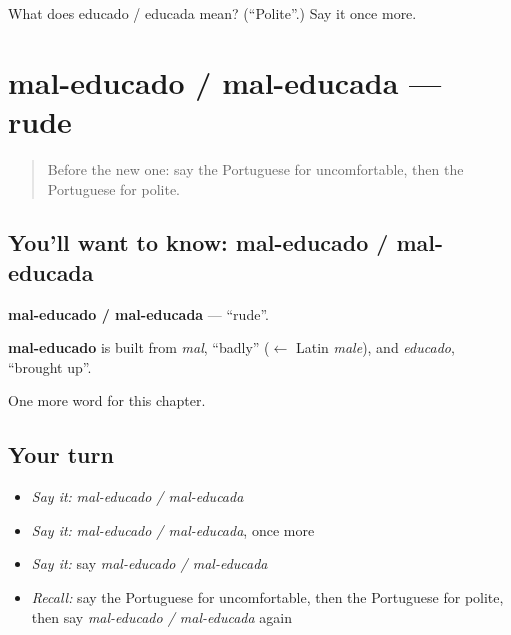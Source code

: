 \begin{tcolorbox}[breakable,colback=teal!4,colframe=teal!35!black,title={Before you move on}]
What does educado / educada mean? (\textquotedblleft{}Polite\textquotedblright{}.) Say it once more.
\end{tcolorbox}
\section[mal-educado / mal-educada]{mal-educado / mal-educada — rude}

\label{lesson:PT-C153-mal-educado-mal-educada}



\begin{quote}
Before the new one: say the Portuguese for uncomfortable, then the Portuguese for polite.
\end{quote}

\subsection*{You'll want to know: mal-educado / mal-educada}
\textbf{mal-educado / mal-educada} — \textquotedblleft{}rude\textquotedblright{}.

\begin{cousinweb}
\textbf{mal-educado} is built from \emph{mal}, \textquotedblleft{}badly\textquotedblright{} ($\leftarrow$ Latin \emph{male}), and \emph{educado}, \textquotedblleft{}brought up\textquotedblright{}.
\end{cousinweb}

\begin{grammarlens}[title={What you've built}]
One more word for this chapter.
\end{grammarlens}

\subsection*{Your turn}
\begin{itemize}
\raggedright
  \item \emph{Say it:} \emph{mal-educado / mal-educada}
  \item \emph{Say it:} \emph{mal-educado / mal-educada}, once more
  \item \emph{Say it:} say \emph{mal-educado / mal-educada}
  \item \emph{Recall:} say the Portuguese for uncomfortable, then the Portuguese for polite, then say \emph{mal-educado / mal-educada} again
\end{itemize}

